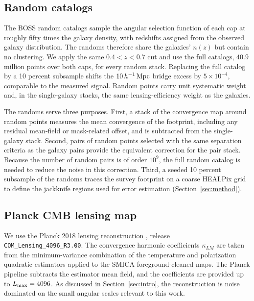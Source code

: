 \subsection{Random catalogs}
\label{sec:data_random}

The BOSS random catalogs \citep{Reid2016} sample the angular selection
function of each cap at roughly fifty times the galaxy density, with
redshifts assigned from the observed galaxy distribution. The randoms
therefore share the galaxies' $n(z)$ but contain no clustering. We apply the
same $0.4<z<0.7$ cut and use the full catalogs, $40.9$ million points over
both caps, for every random stack. Replacing the full catalog by a 10 percent
subsample shifts the $10\,h^{-1}\,{\rm Mpc}$ bridge excess by
$5\times10^{-4}$, comparable to the measured signal.
Random points carry unit systematic weight and, in the single-galaxy stacks,
the same lensing-efficiency weight as the galaxies.

The randoms serve three purposes. First, a stack of the convergence map
around random points measures the mean convergence of the footprint,
including any residual mean-field or mask-related offset, and is subtracted
from the single-galaxy stack. Second, pairs of random points selected with
the same separation criteria as the galaxy pairs provide the equivalent
correction for the pair stack. Because the number of random pairs is of
order $10^{9}$, the full random catalog is needed to reduce the noise in this
correction. Third, a seeded 10 percent subsample of the randoms traces the
survey footprint on a coarse HEALPix grid to define the jackknife regions
used for error estimation (Section~\ref{sec:method}).

\subsection{Planck CMB lensing map}
\label{sec:data_planck}

We use the Planck 2018 lensing reconstruction \citep{Planck2018lensing},
release \texttt{COM\_Lensing\_4096\_R3.00}. The convergence harmonic
coefficients $\kappa_{LM}$ are taken from the minimum-variance combination
of the temperature and polarization quadratic estimators applied to the
SMICA foreground-cleaned maps. The Planck pipeline subtracts the estimator
mean field, and the coefficients are provided up to
$L_{\rm max}=4096$. As discussed in Section~\ref{sec:intro}, the
reconstruction is noise dominated on the small angular scales relevant to
this work.

